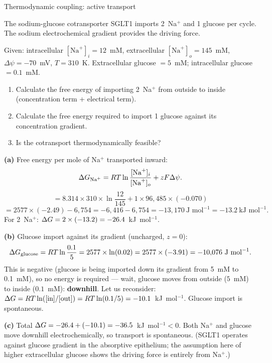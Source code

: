 \documentclass[12pt, a4paper, oneside]{report}
\begin{document}
\begin{problem}{\enspace{}\enspace
  Thermodynamic coupling: active transport}

  The sodium-glucose cotransporter SGLT1 imports 2~Na$^+$ and
  1 glucose per cycle. The sodium electrochemical gradient provides
  the driving force.

  Given: intracellular $[\mathrm{Na}^+]_i = 12$~mM, extracellular
  $[\mathrm{Na}^+]_o = 145$~mM, $\Delta\psi = -70$~mV, $T = 310$~K.
  Extracellular glucose $= 5$~mM; intracellular glucose $= 0.1$~mM.

  \begin{enumerate}
    \item Calculate the free energy of importing 2~Na$^+$ from outside
          to inside (concentration term + electrical term).
    \item Calculate the free energy required to import 1 glucose
          against its concentration gradient.
    \item Is the cotransport thermodynamically feasible?
  \end{enumerate}
\end{problem}

\begin{solution}
  \textbf{(a)} Free energy per mole of Na$^+$ transported inward:
  \[
    \Delta G_{\text{Na}^+} = RT\ln\frac{[\text{Na}^+]_i}{[\text{Na}^+]_o}
                        + zF\Delta\psi.
  \]
  \[
    = 8.314\times310\times\ln\frac{12}{145}
      + 1\times96{,}485\times(-0.070)
  \]
  \[
    = 2577\times(-2.49) - 6{,}754 = -6{,}416 - 6{,}754 = -13{,}170~\text{J~mol}^{-1}
    = -13.2~\text{kJ~mol}^{-1}.
  \]
  For 2~Na$^+$: $\Delta G = 2 \times (-13.2) = -26.4$~kJ~mol$^{-1}$.

  \textbf{(b)} Glucose import against its gradient (uncharged, $z=0$):
  \[
    \Delta G_\text{glucose} = RT\ln\frac{0.1}{5} = 2577\times\ln(0.02)
    = 2577\times(-3.91) = -10{,}076~\text{J~mol}^{-1}.
  \]
  This is negative (glucose is being imported down its gradient from
  5~mM to 0.1~mM), so no energy is required — wait, glucose moves
  from outside ($5$~mM) to inside ($0.1$~mM): \textbf{downhill}.
  Let us reconsider: $\Delta G = RT\ln([\text{in}]/[\text{out}]) =
  RT\ln(0.1/5) = -10.1$~kJ~mol$^{-1}$. Glucose import is spontaneous.

  \textbf{(c)} Total $\Delta G = -26.4 + (-10.1) = -36.5$~kJ~mol$^{-1} < 0$.
  Both Na$^+$ and glucose move downhill electrochemically, so
  transport is spontaneous. (SGLT1 operates against glucose gradient
  in the absorptive epithelium; the assumption here of higher
  extracellular glucose shows the driving force is entirely from Na$^+$.)
\end{solution}
\end{document}
